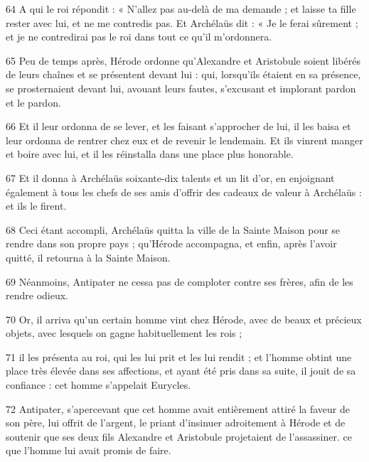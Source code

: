 \par 64 A qui le roi répondit : « N'allez pas au-delà de ma demande ; et laisse ta fille rester avec lui, et ne me contredis pas. Et Archélaüs dit : « Je le ferai sûrement ; et je ne contredirai pas le roi dans tout ce qu’il m’ordonnera.

\par 65 Peu de temps après, Hérode ordonne qu'Alexandre et Aristobule soient libérés de leurs chaînes et se présentent devant lui : qui, lorsqu'ils étaient en sa présence, se prosternaient devant lui, avouant leurs fautes, s'excusant et implorant pardon et le pardon.

\par 66 Et il leur ordonna de se lever, et les faisant s'approcher de lui, il les baisa et leur ordonna de rentrer chez eux et de revenir le lendemain. Et ils vinrent manger et boire avec lui, et il les réinstalla dans une place plus honorable.

\par 67 Et il donna à Archélaüs soixante-dix talents et un lit d'or, en enjoignant également à tous les chefs de ses amis d'offrir des cadeaux de valeur à Archélaüs : et ils le firent.

\par 68 Ceci étant accompli, Archélaüs quitta la ville de la Sainte Maison pour se rendre dans son propre pays ; qu'Hérode accompagna, et enfin, après l'avoir quitté, il retourna à la Sainte Maison.

\par 69 Néanmoins, Antipater ne cessa pas de comploter contre ses frères, afin de les rendre odieux.

\par 70 Or, il arriva qu'un certain homme vint chez Hérode, avec de beaux et précieux objets, avec lesquels on gagne habituellement les rois ;

\par 71 il les présenta au roi, qui les lui prit et les lui rendit ; et l'homme obtint une place très élevée dans ses affections, et ayant été pris dans sa suite, il jouit de sa confiance : cet homme s'appelait Eurycles.

\par 72 Antipater, s'apercevant que cet homme avait entièrement attiré la faveur de son père, lui offrit de l'argent, le priant d'insinuer adroitement à Hérode et de soutenir que ses deux fils Alexandre et Aristobule projetaient de l'assassiner. ce que l'homme lui avait promis de faire.


